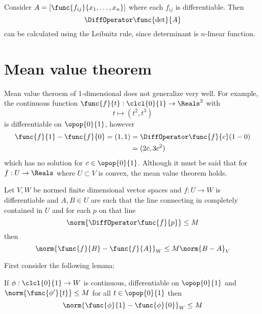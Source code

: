 \begin{example}
    Consider \(A = [\func{f_{ij}}{x_1, \dots , x_n}]\) where each \(f_{ij}\) is differentiable. Then
    \begin{equation*}
        \DiffOperator \func{\det}{A}
    \end{equation*}
    can be calculated using the Leibnitz rule, since determinant is \(n\)-linear function.
\end{example}

\section{Mean value theorem}
Mean value theroem of 1-dimensional does not generalize very well. For example, the continuous function \(\func{f}{t} : \clcl{0}{1} \to \Reals^2\) with
\begin{equation*}
    t \mapsto (t^2, t^3)
\end{equation*}
is differentiable on \(\opop{0}{1}\), however
\begin{align*}
    \func{f}{1} - \func{f}{0} = (1,1) & = \DiffOperator \func{f}{c} (1 - 0) \\
                                      & = (2c,3c^2)
\end{align*}
which has no solution for \(c \in \opop{0}{1}\).
Although it must be said that for \(f: U \to \Reals\) where \(U \subset V\) is convex, the mean value theorem holds.

\begin{theorem} \label{th:MultivariableMVT}
    Let \(V,W\) be normed finite dimensional vector spaces and \(f: U \to W\) is differentiable and \(A,B \in U\) are such that the line connecting in completely contained in \(U\) and for each \(p\) on that line
    \begin{equation*}
        \norm{\DiffOperator \func{f}{p}} \leq M
    \end{equation*}
    then
    \begin{equation*}
        \norm{\func{f}{B} - \func{f}{A}}_W \leq M \norm{B - A}_V
    \end{equation*}
\end{theorem}
First consider the following lemma:
\begin{lemma} \label{lm:MeanValueTheoremLemma}
    If \(\phi: \clcl{0}{1} \to W\) is continuous, differentiable on \(\opop{0}{1}\) and \(\norm{\func{\phi'}{t}} \leq M\) for all \(t \in \opop{0}{1}\) then
    \begin{equation*}
        \norm{\func{\phi}{1} - \func{\phi}{0}}_W \leq M
    \end{equation*}
\end{lemma}

